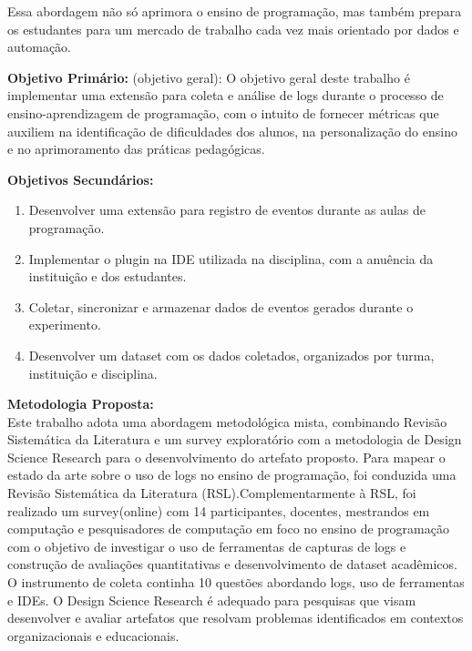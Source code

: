 \documentclass[10pt,a4paper]{article}
\begin{document}
\begin{enumerate}
Essa abordagem não só aprimora o ensino de programação, mas também prepara os estudantes para um mercado de trabalho cada vez mais orientado por dados e automação.


 \noindent \textbf{Objetivo Primário:} (objetivo geral):
O objetivo geral deste trabalho é implementar uma extensão para coleta e análise de logs durante o processo de ensino-aprendizagem de programação, com o intuito de fornecer métricas que auxiliem na identificação de dificuldades dos alunos, na personalização do ensino e no aprimoramento das práticas pedagógicas.
 
 
 \noindent \textbf{Objetivos Secundários:} 
\begin{enumerate}
\item Desenvolver uma extensão para registro de eventos durante as aulas de programação.
\item Implementar o plugin na IDE utilizada na disciplina, com a anuência da instituição e dos estudantes.
\item Coletar, sincronizar e armazenar dados de eventos gerados durante o experimento.
\item Desenvolver um dataset com os dados coletados, organizados por turma, instituição e disciplina.

\end{enumerate}

 \noindent \textbf{Metodologia Proposta:}\\
Este trabalho adota uma abordagem metodológica mista, combinando Revisão Sistemática da Literatura  e um survey exploratório com a metodologia de Design Science Research para o desenvolvimento do artefato proposto. 
Para mapear o estado da arte sobre o uso de logs no ensino de programação, foi conduzida uma Revisão Sistemática da Literatura (RSL).Complementarmente à RSL, foi realizado um survey(online) com 14 participantes, docentes, mestrandos em computação e pesquisadores de computação em foco no ensino de programação com o objetivo de investigar o uso de ferramentas de capturas de logs e construção de avaliações quantitativas e desenvolvimento de dataset acadêmicos. O instrumento de coleta continha 10 questões abordando logs, uso de ferramentas e IDEs. O Design Science Research é adequado para pesquisas que visam desenvolver e avaliar artefatos que resolvam problemas identificados em contextos organizacionais e educacionais.



\end{enumerate}
\end{document}

